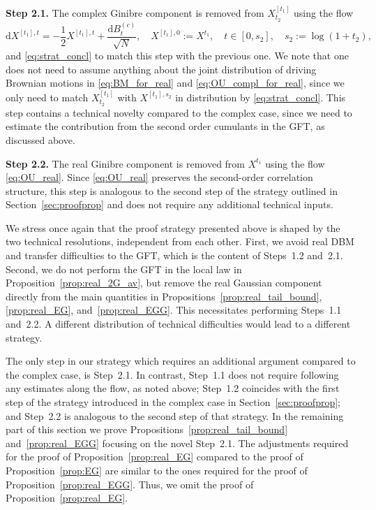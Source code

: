 \documentclass[10pt]{amsart}
\numberwithin{equation}{section}
\newcommand{\dif}{\mathrm{d}}
\begin{document}
\medskip

\noindent\textbf{Step 2.1.} The complex Ginibre component is removed from $X^{[t_1]}_{t_2}$ using the flow 
\begin{equation}
\dif X^{[t_1],t}=-\frac{1}{2}X^{[t_1],t}+\frac{\dif B_t^{(c)}}{\sqrt{N}},\quad X^{[t_1],0}:=X^{t_1},\quad t\in [0,s_2],\quad s_2:=\log(1+t_2),
\label{eq:OU_compl_for_real}
\end{equation}
and \eqref{eq:strat_concl} to match this step with the previous one. We note that one does not need to assume anything about the joint distribution of driving Brownian motions in \eqref{eq:BM_for_real} and \eqref{eq:OU_compl_for_real}, since we only need to match $X^{[t_1]}_{t_2}$ with $X^{[t_1],s_2}$ in distribution by \eqref{eq:strat_concl}. This step contains a technical novelty compared to the complex case, since we need to estimate the contribution from the second order cumulants in the GFT, as discussed above.

\medskip

\noindent\textbf{Step 2.2.} The real Ginibre component is removed from $X^{t_1}$ using the flow \eqref{eq:OU_real}. Since \eqref{eq:OU_real} preserves the second-order correlation structure, this step is analogous to the second step of the strategy outlined in Section~\ref{sec:proofprop} and does not require any additional technical inputs. 

\medskip


We stress once again that the proof strategy presented above is shaped by the two technical resolutions, independent from each other. First, we avoid real DBM and transfer difficulties to the GFT, which is the content of Steps~1.2 and~2.1. Second, we do not perform the GFT in the local law in Proposition~\ref{prop:real_2G_av}, but remove the real Gaussian component directly from the main quantities in Propositions~\ref{prop:real_tail_bound}, \ref{prop:real_EG}, and~\ref{prop:real_EGG}. This necessitates performing Steps~1.1 and~2.2. A different distribution of technical difficulties would lead to a different strategy.

The only step in our strategy which requires an additional argument compared to the complex case, is Step~2.1. In contrast, Step~1.1 does not require following any estimates along the flow, as noted above; Step~1.2 coincides with the first step of the strategy introduced in the complex case in Section~\ref{sec:proofprop}; and Step~2.2 is analogous to the second step of that strategy. In the remaining part of this section we prove Propositions~\ref{prop:real_tail_bound} and~\ref{prop:real_EGG} focusing on the novel Step~2.1. The adjustments required for the proof of Proposition~\ref{prop:real_EG} compared to the proof of Proposition~\ref{prop:EG} are similar to the ones required for the proof of Proposition~\ref{prop:real_EGG}. Thus, we omit the proof of Proposition~\ref{prop:real_EG}. 
\end{document}
